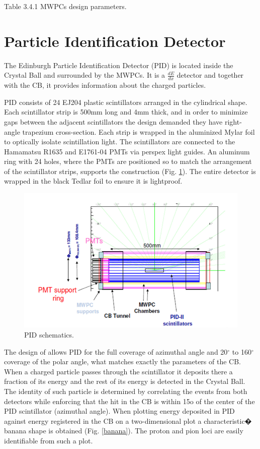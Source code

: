Table 3.4.1 MWPCs design parameters.

\section{Particle Identification Detector}

\indent The Edinburgh Particle Identification Detector (PID) is located inside the Crystal Ball and surrounded by the MWPCs. It is a $\frac{dE}{dx}$ detector and together with the CB, it provides information about the charged particles.

\indent PID consists of 24 EJ204 plastic scintillators arranged in the cylindrical shape. Each scintillator strip is 500mm long and 4mm thick, and in order to minimize gaps between the adjacent scintillators the design demanded they have right-angle trapezium cross-section. Each strip is wrapped in the aluminized Mylar foil to  optically  isolate  scintillation  light.  The  scintillators  are  connected  to  the Hamamatsu R1635 and E1761-04 PMTs via perspex light guides. An aluminum ring with 24 holes, where the PMTs are positioned so to match the arrangement of  the  scintillator  strips,  supports  the  construction  (Fig. \ref{pid}).  The  entire detector is wrapped in the black Tedlar foil to ensure it is lightproof.

\begin{figure}[H]
\begin{center}
\includegraphics[scale=0.5]{pidschematics.png}
\caption{PID schematics.}
\label{pid}
\end{center}
\end{figure}

\indent The design of allows PID for the full coverage of azimuthal angle and 20$^{\circ}$ to 160$^{\circ}$ coverage of the polar angle, what matches exactly the parameters of the CB. When  a  charged  particle  passes  through  the  scintillator  it  deposits  there  a fraction of its energy and the rest of its energy is detected in the Crystal Ball. The identity  of  such  particle  is  determined  by  correlating  the  events  from  both detectors while enforcing that the hit in the CB is within 15o of the center of the PID scintillator (azimuthal angle). When plotting energy deposited in PID against energy registered in the CB on a two-dimensional plot a characteristic� banana shape is obtained (Fig. \ref{banana}). The proton and pion loci are easily identifiable from such a plot.

